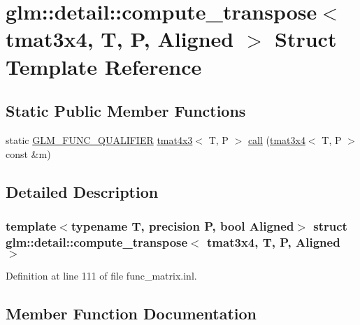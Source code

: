 \hypertarget{structglm_1_1detail_1_1compute__transpose_3_01tmat3x4_00_01_t_00_01_p_00_01_aligned_01_4}{}\section{glm\+::detail\+::compute\+\_\+transpose$<$ tmat3x4, T, P, Aligned $>$ Struct Template Reference}
\label{structglm_1_1detail_1_1compute__transpose_3_01tmat3x4_00_01_t_00_01_p_00_01_aligned_01_4}
\subsection*{Static Public Member Functions}
\begin{DoxyCompactItemize}
\item 
static \mbox{\hyperlink{setup_8hpp_a33fdea6f91c5f834105f7415e2a64407}{G\+L\+M\+\_\+\+F\+U\+N\+C\+\_\+\+Q\+U\+A\+L\+I\+F\+I\+ER}} \mbox{\hyperlink{structglm_1_1tmat4x3}{tmat4x3}}$<$ T, P $>$ \mbox{\hyperlink{structglm_1_1detail_1_1compute__transpose_3_01tmat3x4_00_01_t_00_01_p_00_01_aligned_01_4_af5c3a491c6e6c97e761d8b16fdd8d61d}{call}} (\mbox{\hyperlink{structglm_1_1tmat3x4}{tmat3x4}}$<$ T, P $>$ const \&m)
\end{DoxyCompactItemize}


\subsection{Detailed Description}
\subsubsection*{template$<$typename T, precision P, bool Aligned$>$\newline
struct glm\+::detail\+::compute\+\_\+transpose$<$ tmat3x4, T, P, Aligned $>$}



Definition at line 111 of file func\+\_\+matrix.\+inl.



\subsection{Member Function Documentation}
\mbox{\label{structglm_1_1detail_1_1compute__transpose_3_01tmat3x4_00_01_t_00_01_p_00_01_aligned_01_4_af5c3a491c6e6c97e761d8b16fdd8d61d}} 
